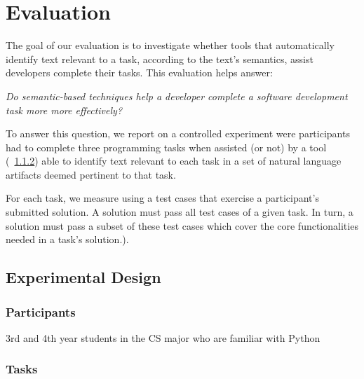 \clearpage

\section{Evaluation}
\label{cp6:evaluation}



The goal of our evaluation is to investigate whether tools  
 that automatically identify text relevant to a task, according to the text's semantics,
 assist developers complete their tasks. This evaluation helps answer: 


\medskip
\begin{bluequote}
    \textit{ Do semantic-based techniques help a 
    developer complete a software development task more more effectively?} 
\end{bluequote}




To answer this question, we report on a controlled experiment were participants 
had to complete three programming tasks when assisted (or not) by a
 tool (~\ref{}) able to identify text relevant to each task 
in a set of natural language artifacts deemed pertinent to that task. 




For each task, we measure  using a test cases that 
exercise a participant's submitted solution. 
A  solution must pass all test cases of a given task. 
In turn, a  solution must pass a subset of these test cases 
which cover the core functionalities needed in a task's solution.).






\subsection{Experimental Design}


\subsubsection{Participants}


3rd and 4th year students in the CS major who are familiar with Python


\subsubsection{Tasks}


